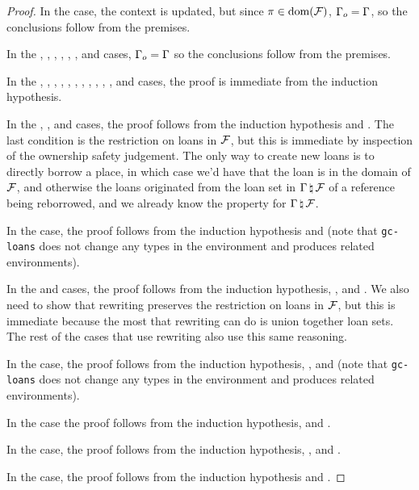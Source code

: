 \begin{proof}
  In the  case, the context is updated, but since $\pi \in
  \textrm{dom}(\mathcal{F})$, $\Gamma_o = \Gamma$, so the conclusions follow
  from the premises.

  In the , , ,
  , , , and  cases,
  $\Gamma_o = \Gamma$ so the conclusions follow from the premises.

  In the , , ,
  , , ,
  , , , ,
  , and  cases, the proof is immediate from the
  induction hypothesis.

  In the , , and 
  cases, the proof follows from the induction hypothesis and
  . The last condition is the
  restriction on loans in $\mathcal{F}$, but this is immediate by inspection of the
  ownership safety judgement. The only way to create new loans is to directly
  borrow a place, in which case we'd have that the loan is in the domain of
  $\mathcal{F}$, and otherwise the loans originated from the loan set in
  $\Gamma \, \natural \, \mathcal{F}$ of a reference being reborrowed, and we
  already know the property for $\Gamma \, \natural \, \mathcal{F}$.

  In the  case, the proof follows from the induction hypothesis
  and  (note that
  \texttt{gc-loans} does not change any types in the environment and produces
  related environments).

  In the  and  cases, the proof follows from
  the induction hypothesis, , and
  . We also need to show that
  rewriting preserves the restriction on loans in $\mathcal{F}$, but this is
  immediate because the most that rewriting can do is union together loan sets.
  The rest of the cases that use rewriting also use this same reasoning.

  In the  case, the proof follows from the induction hypothesis,
  , and
   (note that
  \texttt{gc-loans} does not change any types in the environment and produces
  related environments).

  In the  case the proof follows from the induction
  hypothesis, and .

  In the  case, the proof follows from the induction
  hypothesis, , and
  .

  In the  case, the proof follows from the induction hypothesis
  and .
\end{proof}

